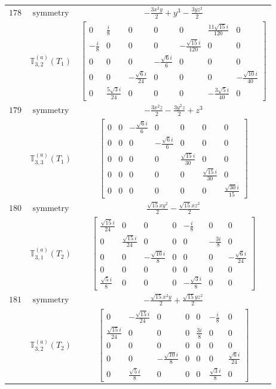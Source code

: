 \documentclass[fleqn,8pt,landscape]{jsarticle}
\begin{document}
\begin{longtable}{ccc}
$ 178 $ & $ \text{symmetry} $ & $ - \frac{3 x^{2} y}{2} + y^{3} - \frac{3 y z^{2}}{2} $ \\
$  $ & $ \mathbb{T}_{3,2}^{(a)}(T_{1}) $ & $ \begin{bmatrix} 0 & \frac{i}{8} & 0 & 0 & 0 & \frac{11 \sqrt{15} i}{120} & 0 \\ - \frac{i}{8} & 0 & 0 & 0 & - \frac{\sqrt{15} i}{120} & 0 & 0 \\ 0 & 0 & 0 & - \frac{\sqrt{6} i}{6} & 0 & 0 & 0 \\ 0 & 0 & - \frac{\sqrt{6} i}{24} & 0 & 0 & 0 & - \frac{\sqrt{10} i}{40} \\ 0 & \frac{5 \sqrt{3} i}{24} & 0 & 0 & 0 & - \frac{3 \sqrt{5} i}{40} & 0 \end{bmatrix} $ \\ \hline
$ 179 $ & $ \text{symmetry} $ & $ - \frac{3 x^{2} z}{2} - \frac{3 y^{2} z}{2} + z^{3} $ \\
$  $ & $ \mathbb{T}_{3,3}^{(a)}(T_{1}) $ & $ \begin{bmatrix} 0 & 0 & - \frac{\sqrt{6} i}{6} & 0 & 0 & 0 & 0 \\ 0 & 0 & 0 & - \frac{\sqrt{6} i}{6} & 0 & 0 & 0 \\ 0 & 0 & 0 & 0 & \frac{\sqrt{15} i}{30} & 0 & 0 \\ 0 & 0 & 0 & 0 & 0 & \frac{\sqrt{15} i}{30} & 0 \\ 0 & 0 & 0 & 0 & 0 & 0 & \frac{\sqrt{30} i}{15} \end{bmatrix} $ \\ \hline
$ 180 $ & $ \text{symmetry} $ & $ \frac{\sqrt{15} x y^{2}}{2} - \frac{\sqrt{15} x z^{2}}{2} $ \\
$  $ & $ \mathbb{T}_{3,1}^{(a)}(T_{2}) $ & $ \begin{bmatrix} \frac{\sqrt{15} i}{24} & 0 & 0 & 0 & - \frac{i}{8} & 0 & 0 \\ 0 & \frac{\sqrt{15} i}{24} & 0 & 0 & 0 & - \frac{3 i}{8} & 0 \\ 0 & 0 & - \frac{\sqrt{10} i}{8} & 0 & 0 & 0 & - \frac{\sqrt{6} i}{24} \\ 0 & 0 & 0 & 0 & 0 & 0 & 0 \\ \frac{\sqrt{5} i}{8} & 0 & 0 & 0 & - \frac{\sqrt{3} i}{8} & 0 & 0 \end{bmatrix} $ \\ \hline
$ 181 $ & $ \text{symmetry} $ & $ - \frac{\sqrt{15} x^{2} y}{2} + \frac{\sqrt{15} y z^{2}}{2} $ \\
$  $ & $ \mathbb{T}_{3,2}^{(a)}(T_{2}) $ & $ \begin{bmatrix} 0 & - \frac{\sqrt{15} i}{24} & 0 & 0 & 0 & - \frac{i}{8} & 0 \\ \frac{\sqrt{15} i}{24} & 0 & 0 & 0 & \frac{3 i}{8} & 0 & 0 \\ 0 & 0 & 0 & 0 & 0 & 0 & 0 \\ 0 & 0 & - \frac{\sqrt{10} i}{8} & 0 & 0 & 0 & \frac{\sqrt{6} i}{24} \\ 0 & \frac{\sqrt{5} i}{8} & 0 & 0 & 0 & \frac{\sqrt{3} i}{8} & 0 \end{bmatrix} $ \\ \hline

\end{longtable}
\end{document}
